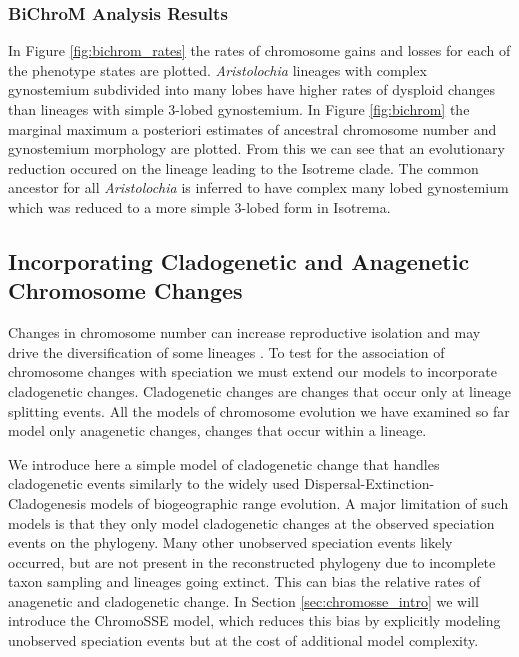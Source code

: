 \subsubsection{BiChroM Analysis Results}

In Figure \ref{fig:bichrom_rates} the rates of
chromosome gains and losses for each of the phenotype states are plotted.
\textit{Aristolochia} lineages with complex gynostemium subdivided into many lobes
have higher rates of dysploid changes than lineages with simple 3-lobed gynostemium.
In Figure \ref{fig:bichrom} the marginal maximum a posteriori estimates of ancestral
chromosome number and gynostemium morphology are plotted.
From this we can see that an evolutionary reduction occured on the lineage
leading to the Isotreme clade. The common ancestor for all
\textit{Aristolochia} is inferred to have complex many lobed
gynostemium which was reduced to a more simple 3-lobed form in Isotrema.  




\subsection{Incorporating Cladogenetic and Anagenetic Chromosome Changes}\label{subsect:clado_simple}

Changes in chromosome number can increase reproductive isolation and may drive the diversification
of some lineages \citep{stebbins1971chromosomal}. 
To test for the association
of chromosome changes with speciation we must extend our models to incorporate cladogenetic
changes. Cladogenetic changes are changes that occur only at lineage splitting events.
All the models of chromosome evolution we have examined so far model
only anagenetic changes, changes that occur within a lineage. 

We introduce here a simple model of cladogenetic change that handles cladogenetic events
similarly to the widely used Dispersal-Extinction-Cladogenesis \citep[DEC;][]{ree08} 
models of biogeographic range evolution.
A major limitation of such models is that they only model cladogenetic changes
at the observed speciation events on the phylogeny.
Many other unobserved speciation events likely occurred, but are not present
in the reconstructed phylogeny due to incomplete taxon sampling and lineages
going extinct. This can bias the relative rates of anagenetic and cladogenetic change.
In Section \ref{sec:chromosse_intro} we will introduce the
ChromoSSE model, which reduces this bias by explicitly modeling unobserved speciation events but at the
cost of additional model complexity.

